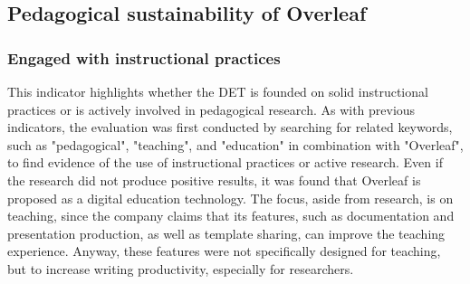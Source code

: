 \bigskip

\subsection{Pedagogical sustainability of Overleaf}
\label{subsec:overleaf-pedagogical}
\medskip

\subsubsection{Engaged with instructional practices}
This indicator highlights whether the DET is founded on solid instructional practices or is actively involved in pedagogical research. As with previous indicators, the evaluation was first conducted by searching for related keywords, such as "pedagogical", "teaching", and "education" in combination with "Overleaf", to find evidence of the use of instructional practices or active research. Even if the research did not produce positive results, it was found that Overleaf is proposed as a digital education technology. The focus, aside from research, is on teaching, since the company claims that its features, such as documentation and presentation production, as well as template sharing, can improve the teaching experience. Anyway, these features were not specifically designed for teaching, but to increase writing productivity, especially for researchers.

